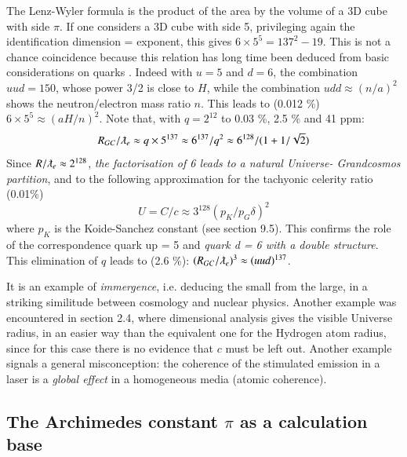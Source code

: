 \documentclass[twoside,draft]{article}
\begin{document}
\begin{sloppypar}
The Lenz-Wyler formula is the product of the area by the volume of a 3D cube with side $\pi$. If one considers a 3D cube with side 5, privileging again the identification dimension = exponent, this gives $6 \times 5^5 = 137^2 - 19 $. This is not a chance coincidence because this relation has long time been deduced from basic considerations on quarks \cite{Sanchez1}. Indeed with $u = 5 $ and $d = 6 $, the combination $uud = 150 $, whose power 3/2 is close to $H$, while the combination $udd \approx (n/a)^2 $ shows the neutron/electron mass ratio $n$. This leads to (0.012 \%) $6\times 5^5 \approx (aH/n)^2 $.  
Note that, with $q = 2^{12}$ to 0.03 \%, 2.5 \% and 41 ppm:
$$R_{GC}/\lambdabar_e \approx q\times 5^{137} \approx 6^{137}/q^2 \approx 6^{128}/(1+1/\sqrt2)$$
Since $R/\lambdabar_e \approx 2^{128}$, \textit{ 
the factorisation of 6 leads to a natural Universe- Grandcosmos partition}, and to the following approximation for the tachyonic celerity ratio (0.01\%) 
$$ U = C/c\approx3^{128} (p_K/p_G \delta)^2 $$ where $p_K$ is the Koide-Sanchez constant (see section 9.5). This confirms the role of the correspondence quark up = 5 and \textit{quark d = 6 with a double structure}. This elimination of $q$ leads to (2.6 \%):
$(R_{GC}/\lambdabar_e)^3 \approx (uud)^{137}$. 

It is an example of \textit{immergence}, i.e. deducing the small from the large, in a striking similitude between cosmology and nuclear physics. Another example was encountered in section 2.4, where dimensional analysis gives the visible Universe radius, in an easier way than the equivalent one for the Hydrogen atom radius, since for this case there is no evidence that $c$ must be left out. Another example signals a general misconception: the coherence of the stimulated emission in a laser is a \textit{global effect} in a homogeneous media (atomic coherence). 

\subsection {The Archimedes constant $\pi$ as a calculation base}


\end{sloppypar}
\end{document}
